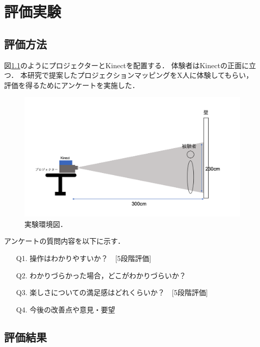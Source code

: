 \chapter{評価実験}
\thispagestyle{fancy}


\section{評価方法}
図\ref{kankyou}のようにプロジェクターとKinectを配置する．
体験者はKinectの正面に立つ．
本研究で提案したプロジェクションマッピングをX人に体験してもらい，
評価を得るためにアンケートを実施した．

\vspace{1cm}
\begin{figure}[h]
  \centering
  \includegraphics[width=14cm]{image/jikkenkankyou.png}
  \caption[実験環境図]{実験環境図．}
\label{kankyou}
\end{figure}


\clearpage

アンケートの質問内容を以下に示す．
\begin{itemize}
  \item[Q1.] 操作はわかりやすいか？　[5段階評価]
  \item[Q2.] わかりづらかった場合，どこがわかりづらいか？ 
  \item[Q3.] 楽しさについての満足感はどれくらいか？　[5段階評価]
  \item[Q4.] 今後の改善点や意見・要望   
\end{itemize}



\section{評価結果}

